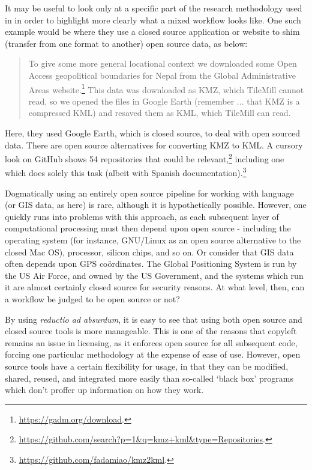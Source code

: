 It may be useful to look only at a specific part of the research methodology used in \citep{gawne2016mapmaking} in order to highlight more clearly what a mixed workflow looks like. One such example would be where they use a closed source application or website to shim (transfer from one format to another) open source data, as below:

\begin{quote}
To give some more general locational context we downloaded some Open Access geopolitical boundaries for Nepal from the Global Administrative Areas website.\footnote{\href{https://gadm.org/download}{https://gadm.org/download}. } This data was downloaded as KMZ, which TileMill cannot read, so we opened the files in Google Earth (remember ... that KMZ is a compressed KML) and resaved them as KML, which TileMill can read. \citep[228]{gawne2016mapmaking}
\end{quote}

Here, they used Google Earth, which is closed source, to deal with open sourced data. There are open source alternatives for converting KMZ to KML. A cursory look on GitHub shows 54 repositories that could be relevant,\footnote{\href{https://github.com/search?p=1&q=kmz+kml&type=Repositories}{https://github.com/search?p=1\&q=kmz+kml\&type=Repositories}. } including one which does solely this task (albeit with Spanish documentation).\footnote{\href{https://github.com/fadamiao/kmz2kml}{https://github.com/fadamiao/kmz2kml}. }

Dogmatically using an entirely open source pipeline for working with language (or GIS data, as here) is rare, although it is hypothetically possible. However, one quickly runs into problems with this approach, as each subsequent layer of computational processing must then depend upon open source - including the operating system (for instance, GNU/Linux as an open source alternative to the closed Mac OS), processor, silicon chips, and so on. Or consider that GIS data often depends upon GPS co\"{o}rdinates. The Global Positioning System is run by the US Air Force, and owned by the US Government, and the systems which run it are almost certainly closed source for security reasons. At what level, then, can a workflow be judged to be open source or not?

By using {\it reductio ad absurdum}, it is easy to see that using both open source and closed source tools is more manageable. This is one of the reasons that copyleft remains an issue in licensing, as it enforces open source for all subsequent code, forcing one particular methodology at the expense of ease of use. However, open source tools have a certain flexibility for usage, in that they can be modified, shared, reused, and integrated more easily than so-called `black box' programs which don't proffer up information on how they work. 

